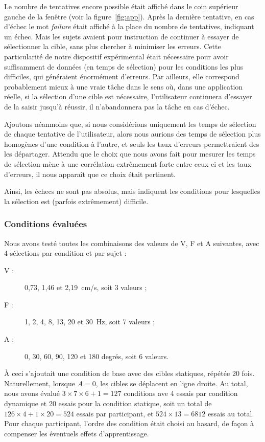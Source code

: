 	Le nombre de tentatives encore possible était affiché dans le coin supérieur gauche de la fenêtre (voir la figure~\ref{fig:app}). Après la dernière tentative, en cas d'échec le mot \emph{failure} était affiché à la place du nombre de tentatives, indiquant un échec. Mais les sujets avaient pour instruction de continuer à essayer de sélectionner la cible, sans plus chercher à minimiser les erreurs. Cette particularité de notre dispositif expérimental était nécessaire pour avoir suffisamment de données (en temps de sélection) pour les conditions les plus difficiles, qui généraient énormément d'erreurs. Par ailleurs, elle correspond probablement mieux à une \og vraie \fg{} tâche dans le sens où, dans une application réelle, si la sélection d'une cible est nécessaire, l'utilisateur continuera d'essayer de la saisir jusqu'à réussir, il n'abandonnera pas la tâche en cas d'échec.
	
	Ajoutons néanmoins que, si nous considérions uniquement les temps de sélection de chaque tentative de l'utilisateur, alors nous aurions des temps de sélection plus homogènes d'une condition à l'autre, et seuls les taux d'erreurs permettraient des les départager. Attendu que le choix que nous avons fait pour mesurer les temps de sélection mène à une corrélation extrêmement forte entre ceux-ci et les taux d'erreurs, il nous apparaît que ce choix était pertinent.
	
	Ainsi, les échecs ne sont pas absolus, mais indiquent les conditions pour lesquelles la sélection est (parfois extrêmement) difficile.
	
	\subsubsection{Conditions évaluées}
	Nous avons testé toutes les combinaisons des valeurs de V, F et A suivantes, avec 4 sélections par condition et par sujet :
	
	\begin{description}
		\item[V :] 0,73, 1,46 et 2,19~cm/s, soit 3 valeurs ;
		\item[F :] 1, 2, 4, 8, 13, 20 et 30~Hz, soit 7 valeurs ;
		\item[A :] 0, 30, 60, 90, 120 et 180 degrés, soit 6 valeurs.
	\end{description}
	
	À ceci s'ajoutait une condition de base avec des cibles statiques, répétée 20 fois. Naturellement, lorsque $A = 0$, les cibles se déplacent en ligne droite. Au total, nous avons évalué $3 \times 7 \times 6 + 1 = 127$ conditions ave 4 essais par condition dynamique et 20 essais pour la condition statique, soit un total de $126 \times 4 + 1 \times 20 = 524$ essais par participant, et $524 \times 13 = 6812$ essais au total. Pour chaque participant, l'ordre des condition était choisi au hasard, de façon à compenser les éventuels effets d'apprentissage.
	
